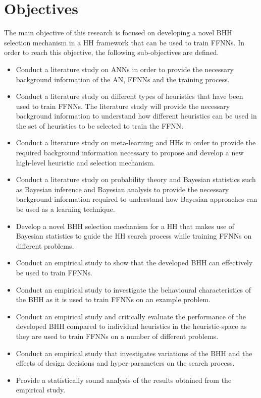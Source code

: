 \section{Objectives}\label{sec:introduction:objectives}

The main objective of this research is focused on developing a novel \Acf{BHH} selection mechanism in a \acs{HH} framework that can be used to train \acp{FFNN}. In order to reach this objective, the following sub-objectives are defined.

\begin{itemize}
      \item Conduct a literature study on \acp{ANN} in order to provide the necessary background information of the \acs{AN}, \acp{FFNN} and the training process.

      \item Conduct a literature study on different types of heuristics that have been used to train \acp{FFNN}. The literature study will provide the necessary background information to understand how different heuristics can be used in the set of heuristics to be selected to train the \acs{FFNN}.

      \item Conduct a literature study on meta-learning and \acp{HH} in order to provide the required background information necessary to propose and develop a new high-level heuristic and selection mechanism.

      \item Conduct a literature study on probability theory and Bayesian statistics such as Bayesian inference and Bayesian analysis to provide the necessary background information required to understand how Bayesian approaches can be used as a learning technique.

      \item Develop a novel \Acs{BHH} selection mechanism for a \acs{HH} that makes use of Bayesian statistics to guide the \acs{HH} search process while training \acp{FFNN} on different problems.

      \item Conduct an empirical study to show that the developed \Acs{BHH} can effectively be used to train \acp{FFNN}.

      \item Conduct an empirical study to investigate the behavioural characteristics of the \Acs{BHH} as it is used to train \acp{FFNN} on an example problem.

      \item Conduct an empirical study and critically evaluate the performance of the developed \Acs{BHH} compared to individual heuristics in the heuristic-space as they are used to train \acp{FFNN} on a number of different problems.

      \item Conduct an empirical study that investigates variations of the \Acs{BHH} and the effects of design decisions and hyper-parameters on the search process.

      \item Provide a statistically sound analysis of the results obtained from the empirical study.
\end{itemize}

